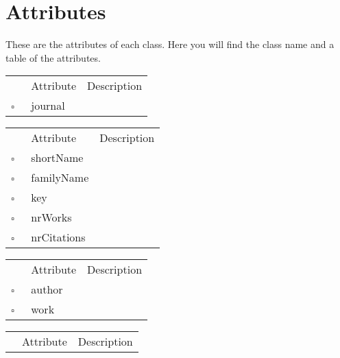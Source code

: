 \chapter{Attributes}
These are the attributes of each class. Here you will find the class name and a table of the attributes.     
\begin{table}
\caption{Article  }

\begin{longtable}{llp{8cm}}
& Attribute & Description \\
$\square$\ & journal &  \\
\end{longtable}
\label{attr:Article}
\end{table}

\clearpage
\begin{table}
\caption{Author  }

\begin{longtable}{llp{8cm}}
& Attribute & Description \\
$\square$\ & shortName &  \\
$\square$\ & familyName &  \\
$\square$\ & key &  \\
$\square$\ & nrWorks &  \\
$\square$\ & nrCitations &  \\
\end{longtable}
\label{attr:Author}
\end{table}

\begin{table}
\caption{Authorship  }

\begin{longtable}{llp{8cm}}
& Attribute & Description \\
$\square$\ & author &  \\
$\square$\ & work &  \\
\end{longtable}
\label{attr:Authorship}
\end{table}

\begin{table}
\caption{Book  }

\begin{longtable}{llp{8cm}}
& Attribute & Description \\
\end{longtable}
\label{attr:Book}
\end{table}

